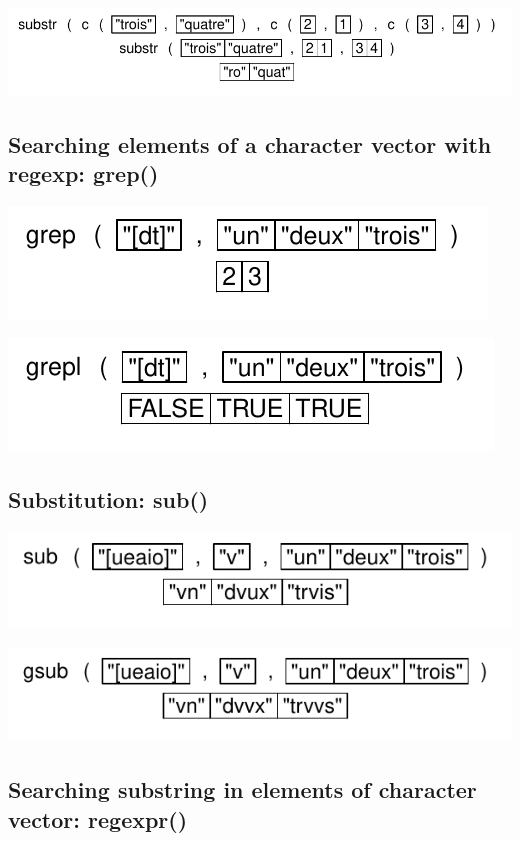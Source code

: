 \documentclass[pdflatex]{article}
\begin{document}
\includegraphics{substr_3.pdf}

\subsection{Searching elements of a character vector with regexp: grep()}

\includegraphics{grep}

\includegraphics{grepl}

\subsection{Substitution: sub()}

\includegraphics{sub}

\includegraphics{gsub}

\subsection{Searching substring in elements of character vector: regexpr()}
\end{document}

